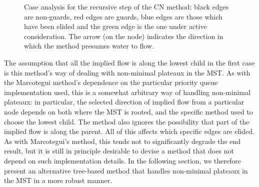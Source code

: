 \documentclass[a4paper]{article}
\newenvironment{stusubfig}[1]
{
	\begin{figure}[#1]
	\begin{center}
}
{
	\end{center}
	\end{figure}
}
\begin{document}
\begin{stusubfig}{p}
	\hspace{4mm}%
\caption[Case analysis for the recursive step of the CN method]{Case analysis for the recursive step of the CN method: black edges are non-guards, red edges are guards, blue edges are those which have been elided and the green edge is the one under active consideration. The arrow (on the node) indicates the direction in which the method presumes water to flow.}
\label{fig:segmentation-waterfall-nicholls-cases}
\end{stusubfig}

The assumption that all the implied flow is along the lowest child in the first case is this method's way of dealing with non-minimal plateaux in the MST. As with the Marcotegui method's dependence on the particular priority queue implementation used, this is a somewhat arbitrary way of handling non-minimal plateaux: in particular, the selected direction of implied flow from a particular node depends on both where the MST is rooted, and the specific method used to choose the lowest child. The method also ignores the possibility that part of the implied flow is along the parent. All of this affects which specific edges are elided. As with Marcotegui's method, this tends not to significantly degrade the end result, but it is still in principle desirable to devise a method that does not depend on such implementation details. In the following section, we therefore present an alternative tree-based method that handles non-minimal plateaux in the MST in a more robust manner.
\end{document}
